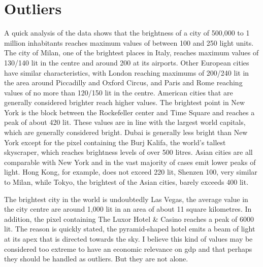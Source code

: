 \section{Outliers}
A quick analysis of the data shows that the brightness of a city of 500,000 to 1 million inhabitants reaches maximum values of between 100 and 250 light units. The city of Milan, one of the brightest places in Italy, reaches maximum values of 130/140 lit in the centre and around 200 at its airports. Other European cities have similar characteristics, with London reaching maximums of 200/240 lit in the area around Piccadilly and Oxford Circus, and Paris and Rome reaching values of no more than 120/150 lit in the centre. American cities that are generally considered brighter reach higher values. The brightest point in New York is the block between the Rockefeller center and Time Square and reaches a peak of about 420 lit. These values are in line with the largest world capitals, which are generally considered bright. Dubai is generally less bright than New York except for the pixel containing the Burj Kalifa, the world's tallest skyscraper, which reaches brightness levels of over 500 litres. Asian cities are all comparable with New York and in the vast majority of cases emit lower peaks of light. Hong Kong, for example, does not exceed 220 lit, Shenzen 100, very similar to Milan, while Tokyo, the brightest of the Asian cities, barely exceeds 400 lit.

The brightest city in the world is undoubtedly Las Vegas, the average value in the city centre are around 1,000 lit in an area of about 11 square kilometres. In addition, the pixel containing The Luxor Hotel & Casino reaches a peak of 6000 lit. The reason is quickly stated, the pyramid-shaped hotel emits a beam of light at its apex that is directed towards the sky. I believe this kind of values may be considered too extreme to have an economic relevance on gdp and that perhaps they should be handled as outliers. But they are not alone.

